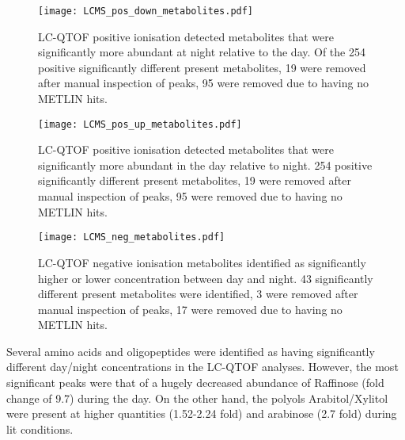 \begin{figure}
    \centering
    \texttt{[image: LCMS\_pos\_down\_metabolites.pdf]}
    \caption[LC-QTOF positive ionisation lowered concentration metabolites]{LC-QTOF positive ionisation detected metabolites
        that were significantly more abundant at night relative to the day. Of the 254 positive significantly different present metabolites,
        19 were removed after manual inspection of peaks, 95 were removed due to having no METLIN hits.}
    \label{fig:posqtofdown}
\end{figure}


\begin{figure}
    \centering
    \texttt{[image: LCMS\_pos\_up\_metabolites.pdf]}
    \caption[LC-QTOF positive ionisation increased concentration metabolites]{LC-QTOF positive ionisation detected metabolites
        that were significantly more abundant in the day relative to night. 254 positive significantly different present metabolites,
        19 were removed after manual inspection of peaks, 95 were removed due to having no METLIN hits.}
    \label{fig:posqtofup}
\end{figure}


\begin{figure}
    \centering
    \texttt{[image: LCMS\_neg\_metabolites.pdf]}
    \caption[LC-QTOF negative ionisation metabolites]{LC-QTOF negative ionisation metabolites identified
        as significantly higher or lower concentration between day and night. 
        43 significantly different present metabolites were identified,
        3 were removed after manual inspection of peaks, 17 were removed due
    to having no METLIN hits.}
    \label{fig:negqtof}
\end{figure}


Several amino acids and oligopeptides were identified as having significantly
different day/night concentrations in the LC-QTOF analyses. However,
the most significant peaks were that of a hugely decreased abundance of
Raffinose (fold change of 9.7) during the day.  
On the other hand, the polyols Arabitol/Xylitol were present at higher quantities (1.52-2.24 fold)
and arabinose (2.7 fold) during lit conditions.
%
%


